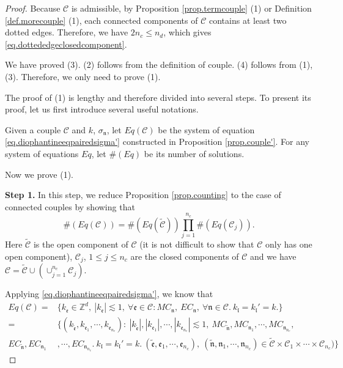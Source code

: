 \begin{proof} Because $\mathcal{C}$ is admissible, by Proposition \ref{prop.termcouple} (1) or Definition \ref{def.morecouple} (1), each connected components of $\mathcal{C}$ contains at least two dotted edges. Therefore, we have $2n_{c}\le n_d$, which gives \eqref{eq.dottededgeclosedcomponent}.

We have proved (3). (2) follows from the definition of couple. (4) follows from (1), (3). Therefore, we only need to prove (1).

The proof of (1) is lengthy and therefore divided into several steps. To present its proof, let us first introduce several useful notations.

Given a couple $\mathcal{C}$ and $k$, $\sigma_{\mathfrak{n}}$, let $Eq(\mathcal{C})$ be the system of equation \eqref{eq.diophantineeqpairedsigma'} constructed in Proposition \ref{prop.couple'}. For any system of equations $Eq$, let $\#(Eq)$ be its number of solutions.

Now we prove (1).

\textbf{Step 1.} In this step, we reduce Proposition \ref{prop.counting} to the case of connected couples by showing that
\begin{equation}\label{eq.conn}
    \#(Eq(\mathcal{C}))= \#(Eq(\widetilde{\mathcal{C}}))\prod_{j=1}^{n_c} \#(Eq(\mathcal{C}_{j})).
\end{equation}
Here $\widetilde{\mathcal{C}}$ is the open component of $\mathcal{C}$ (it is not difficult to show that $\mathcal{C}$ only has one open component), $\mathcal{C}_{j}$, $1\le j\le n_c$ are the closed components of $\mathcal{C}$ and we have $\mathcal{C}=\widetilde{\mathcal{C}}\cup(\cup_{j=1}^{n_c} \mathcal{C}_{j})$.

Applying \eqref{eq.diophantineeqpairedsigma'}, we know that 
\begin{equation}\label{eq.Eq(C)expand}
\begin{split}
    Eq(\mathcal{C})=&\{k_{\mathfrak{e}}\in \mathbb{Z}^d,\ |k_{\mathfrak{e}}| \lesssim 1,\ \forall \mathfrak{e}\in \mathcal{C}:MC_{\mathfrak{n}},\  EC_{\mathfrak{n}},\ \forall \mathfrak{n}\in \mathcal{C}.\ k_{\mathfrak{l}}=k_{\mathfrak{l}}'=k.\}   
    \\
    =&\{(k_{\widetilde{\mathfrak{e}}},k_{\mathfrak{e}_1},\cdots,k_{\mathfrak{e}_{n_c}}):\ |k_{\widetilde{\mathfrak{e}}}|,|k_{\mathfrak{e}_1}|,\cdots,|k_{\mathfrak{e}_{n_c}}| \lesssim 1,\ MC_{\widetilde{\mathfrak{n}}},MC_{\mathfrak{n}_1},\cdots, MC_{\mathfrak{n}_{n_c}},
    \\
    EC_{\widetilde{\mathfrak{n}}},EC_{\mathfrak{n}_1}&,\cdots, EC_{\mathfrak{n}_{n_c}}.\ k_{\mathfrak{l}}=k_{\mathfrak{l}}'=k.\  (\widetilde{\mathfrak{e}},\mathfrak{e}_1,\cdots,\mathfrak{e}_{n_c}),\  (\widetilde{\mathfrak{n}},\mathfrak{n}_1,\cdots,\mathfrak{n}_{n_c})\in \widetilde{\mathcal{C}}\times \mathcal{C}_{1}\times \cdots\times \mathcal{C}_{n_c})\}
\end{split}
\end{equation}


\end{proof}
